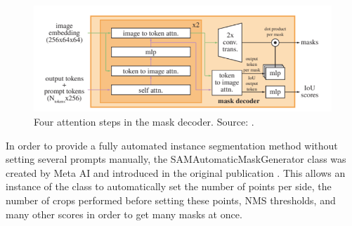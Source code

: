 \begin{figure}
	\centering
	\includegraphics[width=\textwidth]{"images/maskdecoder.png"}
	\caption[\texttt{SAM} mask decoder]{Four attention steps in the mask decoder. Source: \cite{kirillov2023segment}.}
	\label{figdecoder}
\end{figure}

In order to provide a fully automated instance segmentation method without setting several prompts manually, the SAMAutomaticMaskGenerator class was created by Meta AI and introduced in the original publication \cite{kirillov2023segment}. This allows an instance of the class to automatically set the number of points per side, the number of crops performed before setting these points, NMS thresholds, and many other scores in order to get many masks at once.